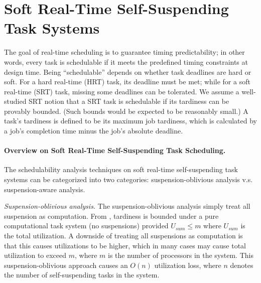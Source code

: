 \section{Soft Real-Time Self-Suspending Task Systems}

The goal of real-time scheduling is to guarantee timing predictability; in other words, every task is schedulable if it meets the predefined timing constraints at design time. Being ``schedulable'' depends on whether task deadlines are hard or soft. 
For a hard real-time (HRT) task, its deadline must be met; while for a soft real-time (SRT) task, missing some deadlines can be tolerated. We assume a well-studied SRT notion \cite{mills2010stochastic, erickson2012soft, johndissertation, BBBdissertation, devidissertation, leontyevdissertation} that a SRT task is schedulable if its tardiness can be provably bounded. (Such bounds would be expected to be reasonably small.) A task's tardiness is defined to be its maximum job tardiness, which is calculated by a job's completion time minus the job's absolute deadline.

\paragraph{Overview on Soft Real-Time Self-Suspending Task Scheduling.}
The schedulability analysis techniques on soft real-time self-suspending task systems can be categorized into two categories: suspension-oblivious analysis v.s. suspension-aware analysis.

\textit{Suspension-oblivious analysis.} The suspension-oblivious analysis simply treat all suspension as computation. From \cite{Devi2005,Leontyev072}, tardiness is bounded under a pure computational task system (no suspensions) provided $U_{sum} \leq m$ where $U_{sum}$ is the total utilization. A downside of treating all suspensions as computation is that this causes utilizations to be higher, which in many cases may cause total utilization to exceed $m$, where $m$ is the number of processors in the system.  This suspension-oblivious approach causes an $O(n)$ utilization loss, where $n$ denotes the number of self-suspending tasks in the system. 

